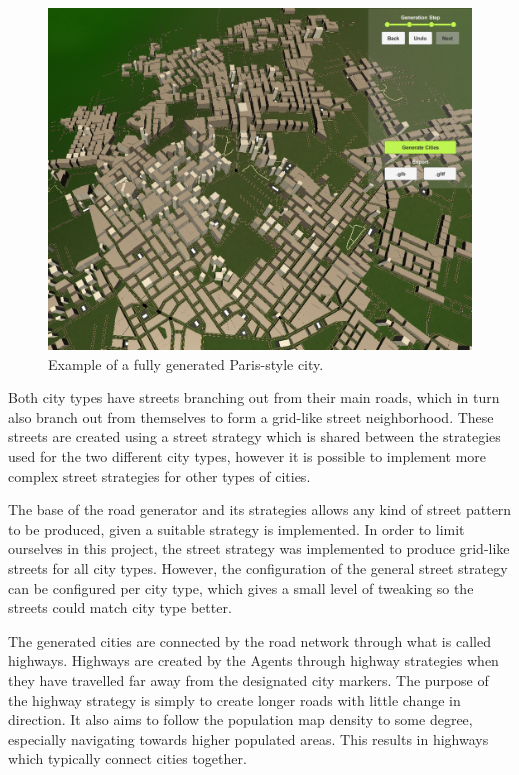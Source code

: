 \begin{figure}[H]
\begin{minipage}{.45\textwidth}
\begin{minipage}{.9\textwidth}
      \includegraphics[width=\textwidth]{figure/results/city_paris.png}
      \caption{Example of a fully generated Paris-style city.}
      \label{fig:results_city_paris}
    \end{minipage}
  \end{minipage}
\end{figure}

Both city types have streets branching out from their main roads, which in turn also branch out from themselves to form a grid-like street neighborhood.
These streets are created using a street strategy which is shared between the strategies used for the two different city types, however it is possible to implement more complex street strategies for other types of cities.

The base of the road generator and its strategies allows any kind of street pattern to be produced, given a suitable strategy is implemented.
In order to limit ourselves in this project, the street strategy was implemented to produce grid-like streets for all city types.
However, the configuration of the general street strategy can be configured per city type, which gives a small level of tweaking so the streets could match city type better.

The generated cities are connected by the road network through what is called highways.
Highways are created by the Agents through highway strategies when they have travelled far away from the designated city markers.
The purpose of the highway strategy is simply to create longer roads with little change in direction.
It also aims to follow the population map density to some degree, especially navigating towards higher populated areas.
This results in highways which typically connect cities together.

